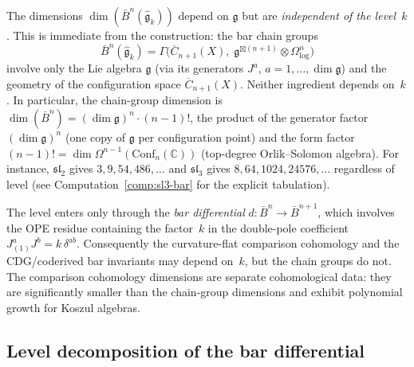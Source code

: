 \begin{lemma}%
\label{lem:bar-dims-level-independent}
The dimensions $\dim(\bar{B}^n(\widehat{\mathfrak{g}}_k))$ depend on
$\mathfrak{g}$ but are \emph{independent of the level~$k$}. This is
immediate from the construction: the bar chain groups
\[
\bar{B}^n(\widehat{\mathfrak{g}}_k)
= \Gamma\!\bigl(\overline{C}_{n+1}(X),\;
 \mathfrak{g}^{\boxtimes(n+1)} \otimes \Omega^n_{\log}\bigr)
\]
involve only the Lie algebra $\mathfrak{g}$ (via its generators
$J^a$, $a = 1, \ldots, \dim\mathfrak{g}$) and the geometry of the
configuration space $\overline{C}_{n+1}(X)$. Neither ingredient
depends on~$k$. In particular, the chain-group dimension
is $\dim(\bar{B}^n) = (\dim\mathfrak{g})^n \cdot (n-1)!$,
the product of the generator factor $(\dim\mathfrak{g})^n$
(one copy of $\mathfrak{g}$ per configuration point) and
the form factor $(n-1)! = \dim\Omega^{n-1}(\mathrm{Conf}_n(\mathbb{C}))$
(top-degree Orlik--Solomon algebra). For instance,
$\mathfrak{sl}_2$ gives $3, 9, 54, 486, \ldots$ and
$\mathfrak{sl}_3$ gives $8, 64, 1024, 24576, \ldots$ regardless of
level (see Computation~\ref{comp:sl3-bar} for the
explicit tabulation).

The level enters only through the \emph{bar differential}
$d\colon \bar{B}^n \to \bar{B}^{n+1}$, which involves the OPE
residue containing the factor~$k$ in the double-pole coefficient
$J^a_{(1)}J^b = k\,\delta^{ab}$. Consequently the
curvature-flat comparison cohomology and the CDG/coderived
bar invariants may depend on~$k$, but the chain groups do not.
The comparison cohomology dimensions are separate cohomological data:
they are significantly smaller than the chain-group dimensions and
exhibit polynomial growth for Koszul algebras.
\end{lemma}

\subsection{Level decomposition of the bar differential}

